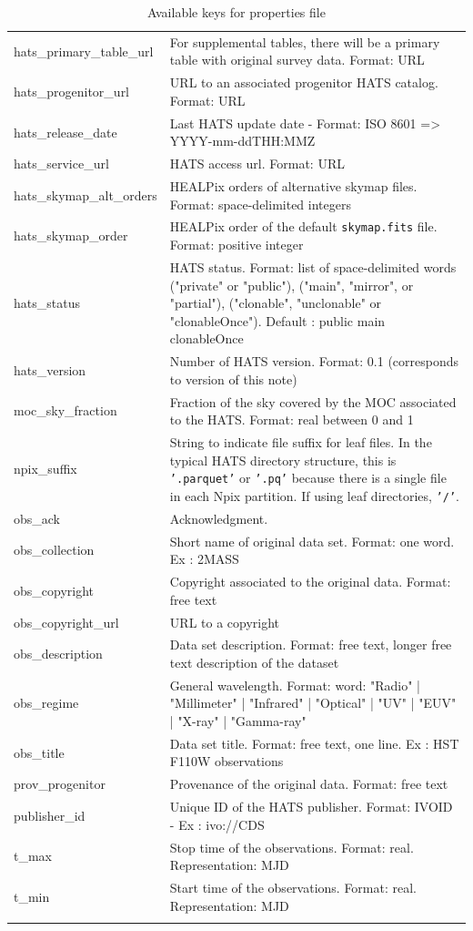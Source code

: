 \documentclass[11pt,a4paper]{ivoa}
\begin{document}
{\begin{longtable}[h!]{D{0.33\textwidth} D{0.67\textwidth}}
hats\_primary\_table\_url &For supplemental tables, there will be a primary table with original survey data. Format: URL\\
hats\_progenitor\_url &URL to an associated progenitor HATS catalog. Format: URL \\
hats\_release\_date &Last HATS update date - Format: ISO 8601 => YYYY-mm-ddTHH:MMZ \\
hats\_service\_url &HATS access url. Format: URL \\
hats\_skymap\_alt\_orders &HEALPix orders of alternative skymap files. Format: space-delimited integers \\
hats\_skymap\_order &HEALPix order of the default \texttt{skymap.fits} file. Format: positive integer \\
hats\_status &HATS status. Format: list of space-delimited words ("private" or "public"), ("main", "mirror", or "partial"), ("clonable", "unclonable" or "clonableOnce"). Default : public main clonableOnce \\
hats\_version &Number of HATS version. Format: 0.1 (corresponds to version of this note) \\
moc\_sky\_fraction &Fraction of the sky covered by the MOC associated to the HATS. Format: real between 0 and 1 \\
npix\_suffix & String to indicate file suffix for leaf files. In the typical HATS directory structure, this is \texttt{'.parquet'} or \texttt{'.pq'} because there is a single file in each Npix partition. If using leaf directories, \texttt{'/'}. \\
obs\_ack &Acknowledgment. \\
obs\_collection &Short name of original data set. Format: one word. Ex : 2MASS \\
obs\_copyright &Copyright associated to the original data. Format: free text \\
obs\_copyright\_url &URL to a copyright  \\
obs\_description &Data set description. Format: free text, longer free text description of the dataset \\
obs\_regime &General wavelength. Format: word: "Radio" | "Millimeter" | "Infrared" | "Optical" | "UV" | "EUV" | "X-ray" | "Gamma-ray" \\
obs\_title &Data set title. Format: free text, one line. Ex : HST F110W observations \\
prov\_progenitor &Provenance of the original data. Format: free text \\
publisher\_id &Unique ID of the HATS publisher. Format: IVOID - Ex : ivo://CDS \\
t\_max &Stop time of the observations. Format: real. Representation: MJD \\
t\_min &Start time of the observations. Format: real. Representation: MJD \\
\sptablerule    
\caption{Available keys for properties file}
\label{tab:properties}
\end{longtable}}
\end{document}
